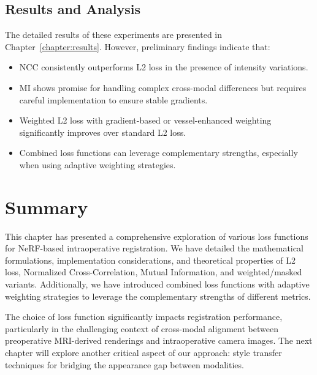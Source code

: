 \subsection{Results and Analysis}

The detailed results of these experiments are presented in Chapter~\ref{chapter:results}. However, preliminary findings indicate that:

\begin{itemize}
    \item NCC consistently outperforms L2 loss in the presence of intensity variations.
    
    \item MI shows promise for handling complex cross-modal differences but requires careful implementation to ensure stable gradients.
    
    \item Weighted L2 loss with gradient-based or vessel-enhanced weighting significantly improves over standard L2 loss.
    
    \item Combined loss functions can leverage complementary strengths, especially when using adaptive weighting strategies.
\end{itemize}

\section{Summary}

This chapter has presented a comprehensive exploration of various loss functions for NeRF-based intraoperative registration. We have detailed the mathematical formulations, implementation considerations, and theoretical properties of L2 loss, Normalized Cross-Correlation, Mutual Information, and weighted/masked variants. Additionally, we have introduced combined loss functions with adaptive weighting strategies to leverage the complementary strengths of different metrics.

The choice of loss function significantly impacts registration performance, particularly in the challenging context of cross-modal alignment between preoperative MRI-derived renderings and intraoperative camera images. The next chapter will explore another critical aspect of our approach: style transfer techniques for bridging the appearance gap between modalities. 